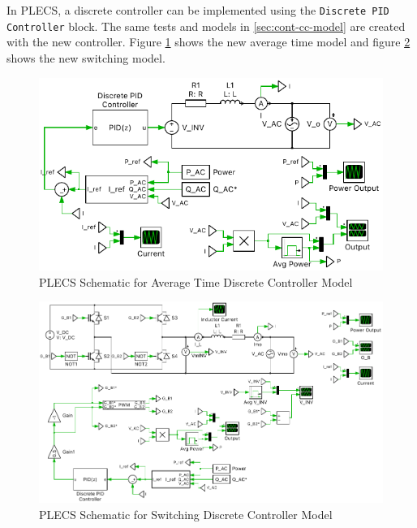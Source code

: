\documentclass[12pt]{article}
\begin{document}
In PLECS, a discrete controller can be implemented using the \lstinline[breaklines]{Discrete PID Controller} block.
The same tests and models in \ref{sec:cont-cc-model} are created with the new controller.
Figure \ref{fig:avg-time-z-c-model} shows the new average time model and figure \ref{fig:switching-z-c-model} shows the new switching model.

\begin{figure}[ht]
    \centering{}
    \includegraphics[width=\textwidth, height=0.4\textheight, keepaspectratio]{img/Average Time Z-C Model.pdf}
    \caption{PLECS Schematic for Average Time Discrete Controller Model}
    \label{fig:avg-time-z-c-model}
\end{figure}

\begin{figure}[ht]
    \centering{}
    \includegraphics[width=\textwidth, height=0.4\textheight, keepaspectratio]{img/Switching Z-C Model.pdf}
    \caption{PLECS Schematic for Switching Discrete Controller Model}
    \label{fig:switching-z-c-model}
\end{figure}
\end{document}
